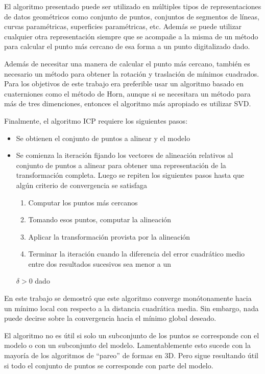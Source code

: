 El algoritmo presentado puede ser utilizado en múltiples tipos de representaciones de datos geométricos como conjunto de puntos, conjuntos de segmentos de líneas, curvas paramétricas, superficies paramétricas, etc. Además se puede utilizar cualquier otra representación siempre que se acompañe a la misma de un método para calcular el punto más cercano de esa forma a un punto digitalizado dado.

Además de necesitar una manera de calcular el punto más cercano, también es necesario un método para obtener la rotación y traslación de mínimos cuadrados. Para los objetivos de este trabajo era preferible usar un algoritmo basado en cuaterniones como el método de Horn, aunque si se necesitara un método para más de tres dimenciones, entonces el algoritmo más apropiado es utilizar SVD.

Finalmente, el algoritmo ICP requiere los siguientes pasos:
\begin{itemize}
	\item Se obtienen el conjunto de puntos a alinear y el modelo
	\item Se comienza la iteración fijando los vectores de alineación relativos al conjunto de puntos a alinear para obtener una representación de la transformación completa. Luego se repiten los siguientes pasos hasta que algún criterio de convergencia se satisfaga
	\begin{enumerate}
		\item Computar los puntos más cercanos
		\item Tomando esos puntos, computar la alineación
		\item Aplicar la transformación provista por la alineación
		\item Terminar la iteración cuando la diferencia del error cuadrático medio entre dos resultados sucesivos sea menor a un
	\end{enumerate}
 $\delta > 0$ dado
\end{itemize}

En este trabajo se demostró que este algoritmo converge monótonamente hacia un mínimo local con respecto a la distancia cuadrática media. Sin embargo, nada puede decirse sobre la convergencia hacia el mínimo global deseado.

El algoritmo no es útil si solo un subconjunto de los puntos se corresponde con el modelo o con un subconjunto del modelo. Lamentablemente esto sucede con la mayoría de los algoritmos de ``pareo'' de formas en 3D. Pero sigue resultando útil si todo el conjunto de puntos se corresponde con parte del modelo.

